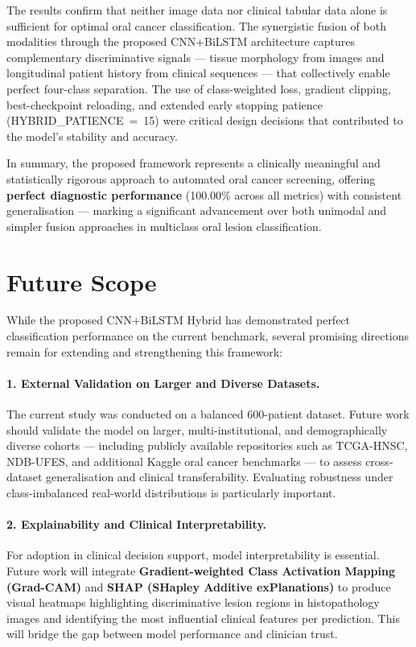 The results confirm that neither image data nor clinical tabular data alone is sufficient for optimal oral cancer classification. The synergistic fusion of both modalities through the proposed CNN+BiLSTM architecture captures complementary discriminative signals — tissue morphology from images and longitudinal patient history from clinical sequences — that collectively enable perfect four-class separation. The use of class-weighted loss, gradient clipping, best-checkpoint reloading, and extended early stopping patience (HYBRID\_PATIENCE~=~15) were critical design decisions that contributed to the model's stability and accuracy.

In summary, the proposed framework represents a clinically meaningful and statistically rigorous approach to automated oral cancer screening, offering \textbf{perfect diagnostic performance} (100.00\% across all metrics) with consistent generalisation — marking a significant advancement over both unimodal and simpler fusion approaches in multiclass oral lesion classification.

\section{Future Scope}
\label{sec:future}

While the proposed CNN+BiLSTM Hybrid has demonstrated perfect classification performance on the current benchmark, several promising directions remain for extending and strengthening this framework:

\paragraph{1. External Validation on Larger and Diverse Datasets.}
The current study was conducted on a balanced 600-patient dataset. Future work should validate the model on larger, multi-institutional, and demographically diverse cohorts — including publicly available repositories such as TCGA-HNSC, NDB-UFES, and additional Kaggle oral cancer benchmarks — to assess cross-dataset generalisation and clinical transferability. Evaluating robustness under class-imbalanced real-world distributions is particularly important.

\paragraph{2. Explainability and Clinical Interpretability.}
For adoption in clinical decision support, model interpretability is essential. Future work will integrate \textbf{Gradient-weighted Class Activation Mapping (Grad-CAM)} and \textbf{SHAP (SHapley Additive exPlanations)} to produce visual heatmaps highlighting discriminative lesion regions in histopathology images and identifying the most influential clinical features per prediction. This will bridge the gap between model performance and clinician trust.

